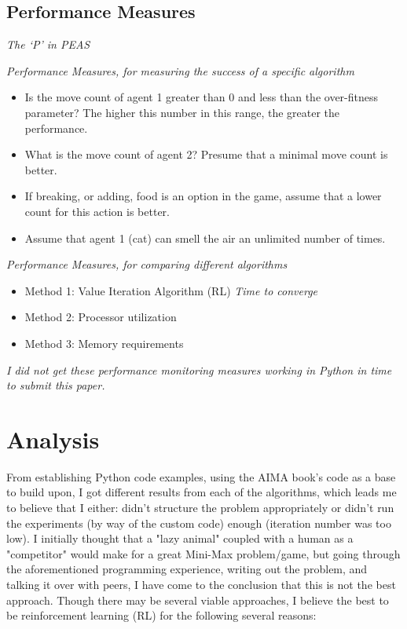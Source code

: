 \documentclass{article}
\begin{document}
\subsection{Performance Measures}
\textit{The `P' in PEAS}

\textit{Performance Measures, for measuring the success of a specific algorithm}
\begin{itemize}
  \item Is the move count of agent 1 greater than 0 and less than the over-fitness parameter? The higher this number in this range, the greater the performance.
  \item What is the move count of agent 2? Presume that a minimal move count is better.
  \item If breaking, or adding, food is an option in the game, assume that a lower count for this action is better.
  \item Assume that agent 1 (cat) can smell the air an unlimited number of times.
\end{itemize}

\textit{Performance Measures, for comparing different algorithms}

\begin{itemize}
  \item Method 1: Value Iteration Algorithm (RL) \cite{mohan2014}
  \textit{Time to converge}
  \item Method 2: Processor utilization
  \item Method 3: Memory requirements
\end{itemize}

\textit{I did not get these performance monitoring measures working in Python in time to submit this paper.}

\section{Analysis}

From establishing Python code examples, using the AIMA book's code as a base to build upon, I got different results from each of the algorithms, which leads me to believe that I either: didn't structure the problem appropriately or didn't run the experiments (by way of the custom code) enough (iteration number was too low). I initially thought that a "lazy animal" coupled with a human as a "competitor" would make for a great Mini-Max problem/game, but going through the aforementioned programming experience, writing out the problem, and talking it over with peers, I have come to the conclusion that this is not the best approach. Though there may be several viable approaches, I believe the best to be reinforcement learning (RL) for the following several reasons:
\end{document}
